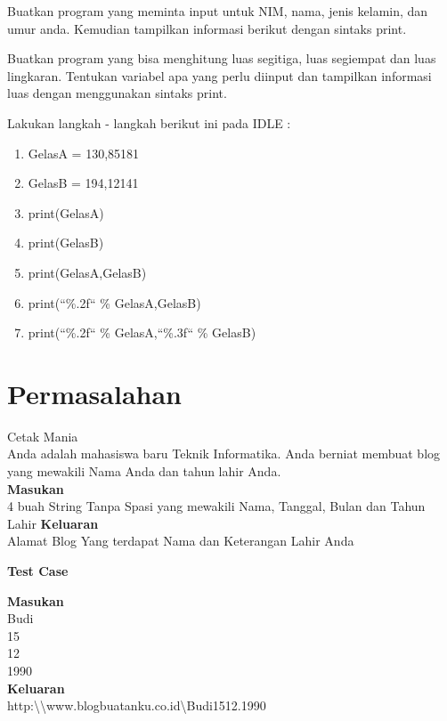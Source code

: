 \begin{latihan}
Buatkan program yang meminta input untuk NIM, nama, jenis kelamin, dan umur anda. Kemudian tampilkan informasi berikut dengan sintaks print.
\end{latihan}

\begin{latihan}
Buatkan program yang bisa menghitung luas segitiga, luas segiempat dan luas lingkaran. Tentukan variabel apa yang perlu diinput dan tampilkan informasi luas dengan menggunakan sintaks print.
\end{latihan}

\begin{latihan}
\label{latihan:Gelas}
Lakukan langkah - langkah berikut ini pada IDLE : 
\begin{enumerate}
	\item GelasA = 130,85181
	\item GelasB = 194,12141
	\item print(GelasA)
	\item print(GelasB)
	\item print(GelasA,GelasB)
	\item print(``\%.2f`` \% GelasA,GelasB)
	\item print(``\%.2f`` \% GelasA,``\%.3f`` \% GelasB)
\end{enumerate}
\end{latihan}


\section{Permasalahan}
\begin{permasalahan}{Cetak Mania}\\
\label{prob:CetakMania}
	Anda adalah mahasiswa baru Teknik Informatika. Anda berniat membuat blog yang mewakili Nama Anda dan tahun lahir Anda.\\
	\textbf{Masukan}\\
	4 buah String Tanpa Spasi yang mewakili Nama, Tanggal, Bulan dan Tahun Lahir
	\textbf{Keluaran}\\
	Alamat Blog Yang terdapat Nama dan Keterangan Lahir Anda
	\begin{center}
	\textbf{Test Case}\\
	\end{center}
	\textbf{Masukan}\\
	Budi \\
	15 \\
	12 \\
	1990 \\
	\textbf{Keluaran}\\
	http:\textbackslash\textbackslash www.blogbuatanku.co.id\textbackslash Budi1512.1990 \\	
\end{permasalahan}


